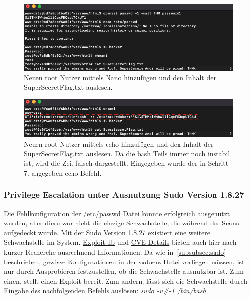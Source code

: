 \documentclass[10pt, a4paper,onecolumn ,titlepage]{article}
\begin{document}
    \begin{figure}[H]
        \centering
        \includegraphics[width=1\textwidth]{storyline_bilder_vm2/addUserReadFlag}
        \caption{Neuen root Nutzer mittels Nano hinzufügen und den Inhalt der SuperSecretFlag.txt auslesen.}
        \label{fig:privilegeEscalation1Screenshot1}
    \end{figure}
    \noindent

    \begin{figure}[H]
        \centering
        \includegraphics[width=1\textwidth]{storyline_bilder_vm2/addUserVersion2}
        \caption{Neuen root Nutzer mittels echo hinzufügen und den Inhalt der SuperSecretFlag.txt auslesen. Da die bash Teils immer noch instabil ist, wird die Zeil falsch dargestellt. Eingegeben wurde der in Schritt 7. angegeben echo Befehl.}
        \label{fig:privilegeEscalation1Screenshot2}
    \end{figure}
    \noindent

    \subsubsection{Privilege Escalation unter Ausnutzung Sudo Version 1.8.27}
    \label{subsubsec:privilegeEscalation2}
    Die Fehlkonfiguration der /etc/passwd Datei konnte erfolgreich ausgenutzt werden, aber diese war nicht die einzige Schwachstelle, die während des Scans aufgedeckt wurde.
    Mit der Sudo Version 1.8.27 existiert eine weitere Schwachstelle im System.
    \href{https://www.exploit-db.com/exploits/47502}{Exploit-db} und \href{https://www.cvedetails.com/cve/CVE-2019-14287/?q=cve-2019-14287}{CVE Details} bieten auch hier nach kurzer Recherche ausrechnend Informationen.
    Da wie in~\ref{subsubsec:sudo} beschrieben, gewisse Konfigurationen in der sudoers Datei vorliegen müssen, ist nur durch Ausprobieren festzustellen, ob die Schwachstelle ausnutzbar ist.
    Zum einen, stellt \textcite{privilegeEscalationSudoExploit} einen Exploit bereit.
    Zum andern, lässt sich die Schwachstelle durch Eingabe des nachfolgenden Befehls auslösen: \textit{sudo -u\#-1 /bin/bash}.
\end{document}
